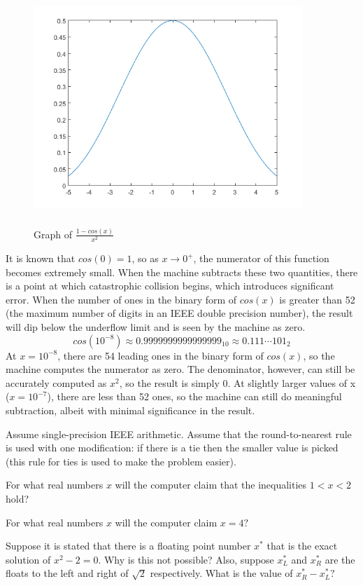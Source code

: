 	\begin{figure}[h!]
		\centering
		\includegraphics[width=4in, height=3.5in]{holmes1_12.png}
		\caption{Graph of $\frac{1-cos(x)}{x^2} $}
		\label{fig:graph333}
	\end{figure}

	It is known that $cos(0) = 1$, so as $x \rightarrow 0^+$, the numerator of this function becomes extremely small. When the machine
	subtracts these two quantities, there is a point at which catastrophic collision begins, which introduces significant error. When the
	number of ones in the binary form of $cos(x)$ is greater than 52 (the maximum number of digits in an IEEE double precision number),
	the result will dip below the underflow limit and is seen by the machine as zero.
	$$cos(10^{-8}) \approx 0.9999999999999999_{10} \approx 0.111\cdots101_2$$
	At $x=10^{-8}$, there are 54 leading ones in the binary form of $cos(x)$, so the machine computes the numerator as zero. The
	denominator, however, can still be accurately computed as $x^2$, so the result is simply 0.
	At slightly
	larger values of x ($x=10^{-7}$), there are less than 52 ones, so the machine can still do meaningful subtraction, albeit with minimal
	significance in the result.

\item
Assume single-precision IEEE arithmetic. Assume that the round-to-nearest rule is used with one modification: if there is a tie then the smaller value is picked (this rule for ties is used to make the problem easier).
\benum
\item For what real numbers $x$ will the computer claim that the inequalities $1 < x < 2$ hold?
\item For what real numbers $x$ will the computer claim $x = 4?$
\item Suppose it is stated that there is a floating point number $x^*$ that is the exact solution of
$x^2-2=0.$   Why is this not possible? Also, suppose $x^*_L$ and $x^*_R$ are the floats to the left and right of $\sqrt 2$ respectively.  What is the value of $x^*_R-x^*_L?$
\eenum

